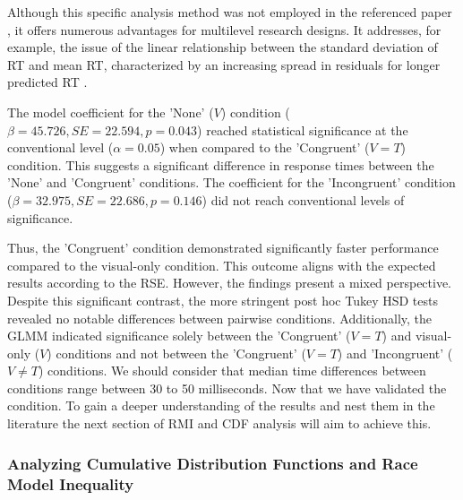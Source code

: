 \documentclass[12pt,oneside,openright]{report}
\begin{document}
Although this specific analysis method was not employed in the referenced paper \parencite{SALTAFOSSI2023108642}, it offers numerous advantages for multilevel research designs. It addresses, for example, the issue of the linear relationship between the standard deviation of RT and mean RT, characterized by an increasing spread in residuals for longer predicted RT \parencite{Lo2015-fv}.

The model coefficient for the 'None' ($V$) condition ($\beta = 45.726, SE = 22.594, p = 0.043$) reached statistical significance at the conventional level ($\alpha =0.05 $) when compared to the 'Congruent' ($V=T$) condition. This suggests a significant difference in response times between the 'None' and 'Congruent' conditions. The coefficient for the 'Incongruent' condition ($\beta = 32.975, SE = 22.686, p = 0.146$) did not reach conventional levels of significance. 

Thus, the 'Congruent' condition demonstrated significantly faster performance compared to the visual-only condition. This outcome aligns with the expected results according to the RSE. However, the findings present a mixed perspective. Despite this significant contrast, the more stringent post hoc Tukey HSD tests revealed no notable differences between pairwise conditions. Additionally, the GLMM indicated significance solely between the 'Congruent' ($V=T$) and visual-only ($V$) conditions and not between the 'Congruent' ($V=T$) and 'Incongruent' ($V \neq T$) conditions. We should consider that median time differences between conditions range between 30 to 50 milliseconds. Now that we have validated the condition. To gain a deeper understanding of the results and nest them in the literature the next section of RMI and CDF analysis will aim to achieve this. 

\subsubsection*{Analyzing Cumulative Distribution Functions and Race Model Inequality}
\end{document}
